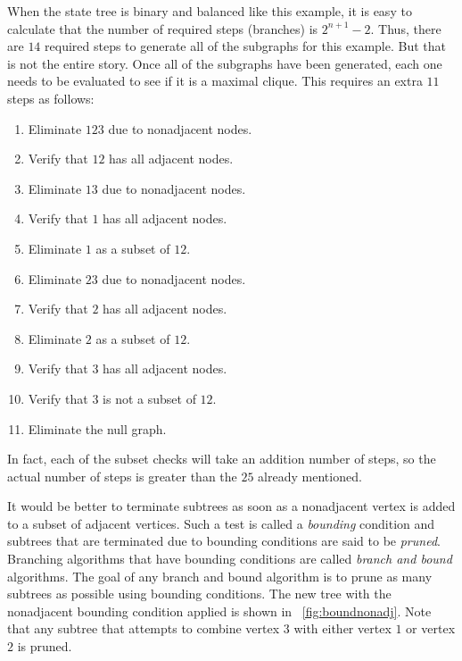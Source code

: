 When the state tree is binary and balanced like this example, it is easy to calculate that the number of required
steps (branches) is \(2^{n+1}-2\).  Thus, there are \(14\) required steps to generate all of the subgraphs for this
example.  But that is not the entire story.  Once all of the subgraphs have been generated, each one needs to be
evaluated to see if it is a maximal clique.  This requires an extra \(11\) steps as follows:
\begin{enumerate}
\item Eliminate \(123\) due to nonadjacent nodes.
\item Verify that \(12\) has all adjacent nodes.
\item Eliminate \(13\) due to nonadjacent nodes.
\item Verify that \(1\) has all adjacent nodes.
\item Eliminate \(1\) as a subset of \(12\).
\item Eliminate \(23\) due to nonadjacent nodes.
\item Verify that \(2\) has all adjacent nodes.
\item Eliminate \(2\) as a subset of \(12\).
\item Verify that \(3\) has all adjacent nodes.
\item Verify that \(3\) is not a subset of \(12\).
\item Eliminate the null graph.
\end{enumerate}

In fact, each of the subset checks will take an addition number of steps, so the actual number of steps is greater
than the \(25\) already mentioned.

It would be better to terminate subtrees as soon as a nonadjacent vertex is added to a subset of adjacent vertices.
Such a test is called a \emph{bounding} condition and subtrees that are terminated due to bounding conditions are
said to be \emph{pruned}.  Branching algorithms that have bounding conditions are called \emph{branch and bound}
algorithms.  The goal of any branch and bound algorithm is to prune as many subtrees as possible using bounding
conditions.  The new tree with the nonadjacent bounding condition applied is shown in
\figurename~\ref{fig:boundnonadj}.  Note that any subtree that attempts to combine vertex \(3\) with either vertex
\(1\) or vertex \(2\) is pruned.

